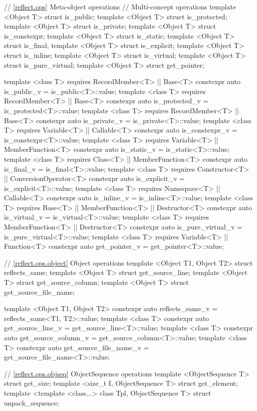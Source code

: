 \begin{std.txt}
\begin{codeblock}
{{{{// \ref{reflect.ops} Meta-object operations
// Multi-concept operations
template <Object T> struct is_public;
template <Object T> struct is_protected;
template <Object T> struct is_private;
template <Object T> struct is_constexpr;
template <Object T> struct is_static;
template <Object T> struct is_final;
template <Object T> struct is_explicit;
template <Object T> struct is_inline;
template <Object T> struct is_virtual;
template <Object T> struct is_pure_virtual;
template <Object T> struct get_pointer;

template <class T>
requires RecordMember<T> || Base<T>
  constexpr auto is_public_v = is_public<T>::value;
template <class T>
requires RecordMember<T> || Base<T>
  constexpr auto is_protected_v = is_protected<T>::value;
template <class T>
requires RecordMember<T> || Base<T>
  constexpr auto is_private_v = is_private<T>::value;
template <class T>
requires Variable<T> || Callable<T>
   constexpr auto is_constexpr_v = is_constexpr<T>::value;
template <class T>
requires Variable<T> || MemberFunction<T>
   constexpr auto is_static_v = is_static<T>::value;
template <class T>
requires Class<T> || MemberFunction<T>
   constexpr auto is_final_v = is_final<T>::value;
template <class T>
requires Constructor<T> || ConversionOperator<T>
   constexpr auto is_explicit_v = is_explicit<T>::value;
template <class T>
requires Namespace<T> || Callable<T>
   constexpr auto is_inline_v = is_inline<T>::value;
template <class T>
requires Base<T> || MemberFunction<T> || Destructor<T>
   constexpr auto is_virtual_v = is_virtual<T>::value;
template <class T>
requires MemberFunction<T> || Destructor<T>
   constexpr auto is_pure_virtual_v = is_pure_virtual<T>::value;
template <class T>
requires Variable<T> || Function<T>
   constexpr auto get_pointer_v = get_pointer<T>::value;

// \ref{reflect.ops.object} Object operations
template <Object T1, Object T2> struct reflects_same;
template <Object T> struct get_source_line;
template <Object T> struct get_source_column;
template <Object T> struct get_source_file_name;

template <Object T1, Object T2>
  constexpr auto reflects_same_v = reflects_same<T1, T2>::value;
template <class T>
  constexpr auto get_source_line_v = get_source_line<T>::value;
template <class T>
  constexpr auto get_source_column_v = get_source_column<T>::value;
template <class T>
  constexpr auto get_source_file_name_v = get_source_file_name<T>::value;

// \ref{reflect.ops.objseq} ObjectSequence operations
template <ObjectSequence T> struct get_size;
template <size_t I, ObjectSequence T> struct get_element;
template <template <class...> class Tpl, ObjectSequence T>
  struct unpack_sequence;

}}}}
\end{codeblock}
\end{std.txt}
